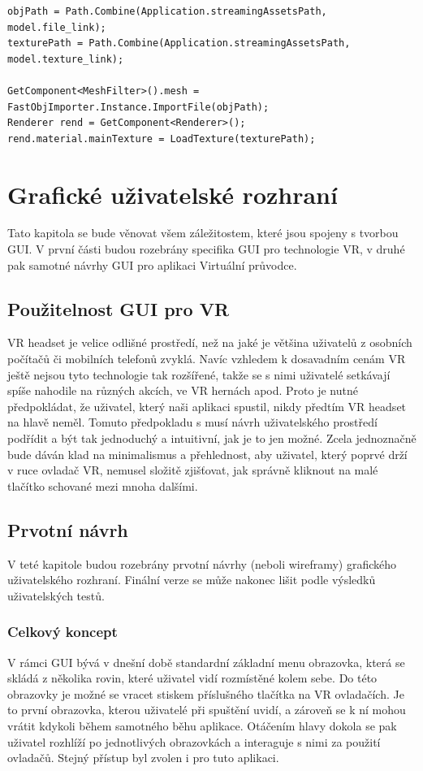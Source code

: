 \documentclass[thesis=B,czech]{FITthesis}[2012/06/26]
\begin{document}
\begin{lstlisting}[frame=single]
objPath = Path.Combine(Application.streamingAssetsPath, model.file_link);
texturePath = Path.Combine(Application.streamingAssetsPath, model.texture_link);

GetComponent<MeshFilter>().mesh = FastObjImporter.Instance.ImportFile(objPath);
Renderer rend = GetComponent<Renderer>();
rend.material.mainTexture = LoadTexture(texturePath);
\end{lstlisting}


	\section{Grafické uživatelské rozhraní}
	\label{sec:GUI}
	
	Tato kapitola se bude věnovat všem záležitostem, které jsou spojeny s tvorbou GUI. V první části budou rozebrány specifika GUI pro technologie VR, v druhé pak samotné návrhy GUI pro aplikaci Virtuální průvodce.
	
	
	\subsection{Použitelnost GUI pro VR}
VR headset je velice odlišné prostředí, než na jaké je většina uživatelů z osobních počítačů či mobilních telefonů zvyklá. Navíc vzhledem k dosavadním cenám VR ještě nejsou tyto technologie tak rozšířené, takže se s nimi uživatelé setkávají spíše nahodile na různých akcích, ve VR hernách apod. Proto je nutné předpokládat, že uživatel, který naši aplikaci spustil, nikdy předtím VR headset na hlavě neměl. Tomuto předpokladu s musí návrh uživatelského prostředí podřídit a být tak jednoduchý a intuitivní, jak je to jen možné. Zcela jednoznačně bude dáván klad na minimalismus a přehlednost, aby uživatel, který poprvé drží v ruce ovladač VR, nemusel složitě zjišťovat, jak správně kliknout na malé tlačítko schované mezi mnoha dalšími.
	
	\subsection{Prvotní návrh}
V teté kapitole budou rozebrány prvotní návrhy (neboli wireframy) grafického uživatelského rozhraní. Finální verze se může nakonec lišit podle výsledků uživatelských testů.

	\subsubsection{Celkový koncept}
V rámci GUI bývá v dnešní době standardní základní menu obrazovka, která se skládá z několika rovin, které uživatel vidí rozmístěné kolem sebe. Do této obrazovky je možné se vracet stiskem příslušného tlačítka na VR ovladačích. Je to první obrazovka, kterou uživatelé při spuštění uvidí, a zároveň se k ní mohou vrátit kdykoli během samotného běhu aplikace. Otáčením hlavy dokola se pak uživatel rozhlíží po jednotlivých obrazovkách a interaguje s nimi za použití ovladačů. Stejný přístup byl zvolen i pro tuto aplikaci. 
\end{document}
